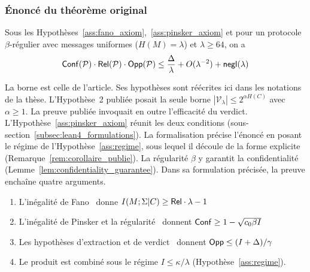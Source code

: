 \begin{sloppypar}
\subsubsection{\'Enonc\'e du th\'eor\`eme original}
\label{subsubsec:enonce_theoreme_original}

\begin{theorem}\label{thm:original_lean4}
Sous les Hypoth\`eses~\ref{ass:fano_axiom},~\ref{ass:pinsker_axiom} et
pour un protocole $\beta$-r\'egulier avec messages uniformes
($H(M)=\lambda$) et $\lambda \ge 64$, on a
\begin{equation}
\mathsf{Conf}(\mathcal{P}) \cdot \mathsf{Rel}(\mathcal{P}) \cdot \mathsf{Opp}(\mathcal{P})
   \le \frac{\Delta}{\lambda} + O(\lambda^{-2}) + \mathsf{negl}(\lambda)
\end{equation}
\end{theorem}

La borne est celle de l'article. Ses hypoth\`eses sont r\'e\'ecrites ici dans les notations de la th\`ese. L'Hypoth\`ese~2 publi\'ee posait la seule borne $|\mathcal{V}_\lambda| \leq 2^{\alpha H(C)}$ avec $\alpha \geq 1$. La preuve publi\'ee invoquait en outre l'efficacit\'e du verdict. L'Hypoth\`ese~\ref{ass:pinsker_axiom} r\'eunit les deux conditions (sous-section~\ref{subsec:lean4_formulations}). La formalisation pr\'ecise l'\'enonc\'e en posant le r\'egime de
l'Hypoth\`ese~\ref{ass:regime}, sous lequel il d\'ecoule de la forme explicite
(Remarque~\ref{rem:corollaire_publie}). La r\'egularit\'e $\beta$ y garantit la confidentialit\'e
(Lemme~\ref{lem:confidentiality_guarantee}). Dans sa formulation pr\'ecis\'ee, la preuve encha\^ine
quatre arguments.
\begin{enumerate}
    \item L'in\'egalit\'e de Fano~\cite{Fano61,CoverThomas06} donne
          $I(M;\Sigma|C) \ge \mathsf{Rel} \cdot \lambda - 1$
    \item L'in\'egalit\'e de Pinsker et la
          r\'egularit\'e~\cite{Pinsker1964,Tsybakov2009} donnent
          $\mathsf{Conf} \ge 1 - \sqrt{c_0 \beta I}$
    \item Les hypoth\`eses d'extraction et de
          verdict~\cite{Simon82,Miller56} donnent
          $\mathsf{Opp} \le (I+\Delta)/\gamma$
    \item Le produit est combin\'e sous le r\'egime
          $I \le \kappa/\lambda$ (Hypoth\`ese~\ref{ass:regime}).
\end{enumerate}


\end{sloppypar}
